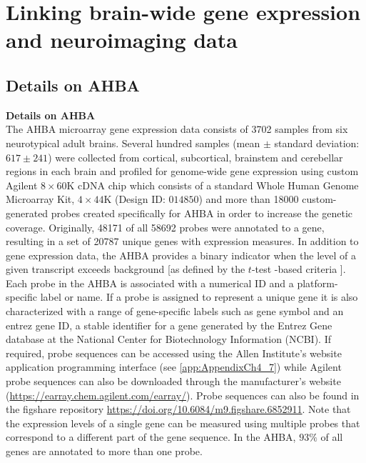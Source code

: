 \chapter{Linking brain-wide gene expression and neuroimaging data}

\section{Details on AHBA}
\label{app:AppendixCh4_1}

\textbf{Details on AHBA}\\
The AHBA microarray gene expression data consists of \num{3702} samples from six  neurotypical adult brains. Several hundred samples (mean $\pm$ standard deviation: $617 \pm 241$) were collected from cortical, subcortical, brainstem and cerebellar regions in each brain and profiled for genome-wide gene expression using custom Agilent $8\times60$K cDNA chip which consists of a standard Whole Human Genome Microarray Kit, $4\times44$K (Design ID: $014850$) and more than \num{18000} custom-generated probes created specifically for AHBA in order to increase the genetic coverage. Originally, \num{48171} of all \num{58692} probes were annotated to a gene, resulting in a set of \num{20787} unique genes with expression measures. In addition to gene expression data, the AHBA provides a binary indicator when the level of a given transcript exceeds background [as defined by the $t$-test -based criteria \citep{AHBAdoc}].
Each probe in the AHBA is associated with a numerical ID and a platform-specific label or name. If a probe is assigned to represent a unique gene it is also characterized with a range of gene-specific labels such as gene symbol and an entrez gene ID, a stable identifier for a gene generated by the Entrez Gene database at the National Center for Biotechnology Information (NCBI). If required, probe sequences can be accessed using the Allen Institute’s website application programming interface (see \ref{app:AppendixCh4_7}) while Agilent probe sequences can also be downloaded through the manufacturer's website (\url{https://earray.chem.agilent.com/earray/}). Probe sequences can also be found in the figshare repository \url{https://doi.org/10.6084/m9.figshare.6852911}. Note that the expression levels of a single gene can be measured using multiple probes that correspond to a different part of the gene sequence. In the AHBA, $93\%$ of all genes are annotated to more than one probe.

